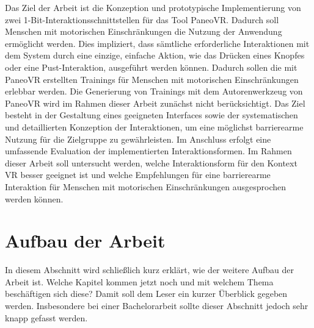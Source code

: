 Das Ziel der Arbeit ist die Konzeption und prototypische Implementierung von zwei 1-Bit-Interaktionsschnittstellen für das Tool PaneoVR. Dadurch soll Menschen mit motorischen Einschränkungen die Nutzung der Anwendung ermöglicht werden. Dies impliziert, dass sämtliche erforderliche Interaktionen mit dem System durch eine einzige, einfache Aktion, wie das Drücken eines Knopfes oder eine Pust-Interaktion, ausgeführt werden können. Dadurch sollen die mit PaneoVR erstellten Trainings für Menschen mit motorischen Einschränkungen erlebbar werden. Die Generierung von Trainings mit dem Autorenwerkzeug von PaneoVR wird im Rahmen dieser Arbeit zunächst nicht berücksichtigt. Das Ziel besteht in der Gestaltung eines geeigneten Interfaces sowie der systematischen und detaillierten Konzeption der Interaktionen, um eine möglichst barrierearme Nutzung für die Zielgruppe zu gewährleisten. Im Anschluss erfolgt eine umfassende Evaluation der implementierten Interaktionsformen. Im Rahmen dieser Arbeit soll untersucht werden, welche Interaktionsform für den Kontext VR besser geeignet ist und welche Empfehlungen für eine barrierearme Interaktion für Menschen mit motorischen Einschränkungen ausgesprochen werden können. 

\section{Aufbau der Arbeit}

In diesem Abschnitt wird schließlich kurz erklärt, wie der weitere Aufbau der Arbeit ist. Welche Kapitel kommen jetzt noch und mit welchem Thema beschäftigen sich diese? Damit soll dem Leser ein kurzer Überblick gegeben werden. Insbesondere bei einer Bachelorarbeit sollte dieser Abschnitt jedoch sehr knapp gefasst werden.
